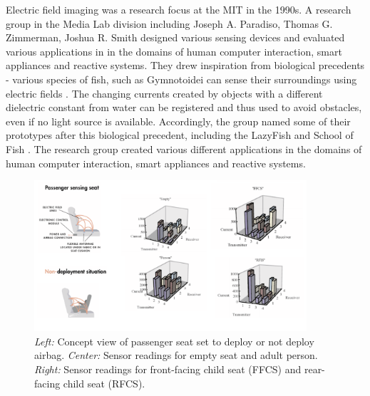 Electric field imaging was a research focus at the MIT in the 1990s. A research group in the Media Lab division including Joseph A. Paradiso, Thomas G. Zimmerman, Joshua R. Smith designed various sensing devices and evaluated various applications in in the domains of human computer interaction, smart appliances and reactive systems. They drew inspiration from biological precedents - various species of fish, such as Gymnotoidei can sense their surroundings using electric fields \cite{Smith1999a}. The changing currents created by objects with a different dielectric constant from water can be registered and thus used to avoid obstacles, even if no light source is available. Accordingly, the group named some of their prototypes after this biological precedent, including the LazyFish and School of Fish \cite{Smith1999a}. The research group created various different applications in the domains of human computer interaction, smart appliances and reactive systems.
\begin{figure}[h]
\centering
\includegraphics[width=0.9\textwidth]{images/nec_passenger_seat}
\caption{\emph{Left:} Concept view of passenger seat set to deploy or not deploy airbag. \emph{Center:} Sensor readings for empty seat and adult person. \emph{Right:} Sensor readings for front-facing child seat (FFCS) and rear-facing child seat (RFCS). \cite{Smith1999a}}
\label{fig:nec_passenger_seat}
\end{figure}

